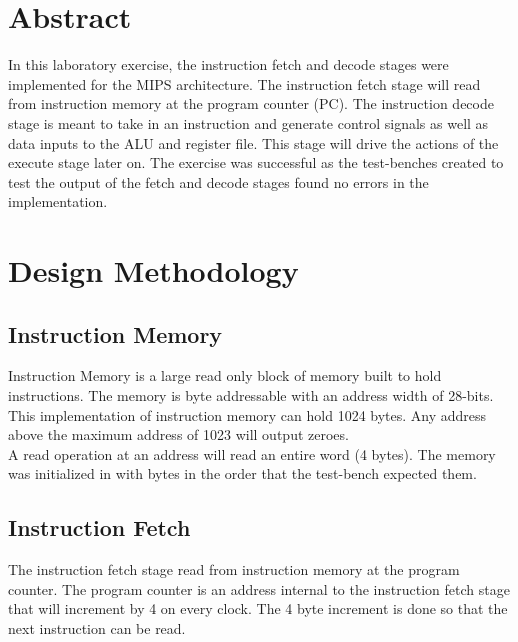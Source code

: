 \documentclass[CMPE]{../KGCOEReport}
\begin{document}
    \maketitle
    \section*{Abstract}

    In this laboratory exercise, the instruction fetch and decode stages were
    implemented for the MIPS architecture.
    The instruction fetch stage will read from instruction memory at the
    program counter (PC).
    The instruction decode stage is meant to take in an instruction and generate
    control signals as well as data inputs to the ALU and register file.
    This stage will drive the actions of the execute stage later on.
    The exercise was successful as the test-benches created to test the
    output of the fetch and decode stages found no errors in the implementation.

    \section*{Design Methodology}

    \subsection*{Instruction Memory}
    
	Instruction Memory is a large read only block of memory built to hold
	instructions. The memory is byte addressable with an address width of 
	28-bits. This implementation of instruction memory can hold 1024 bytes.
	Any address above the maximum address of 1023 will output zeroes.
	\\

    A read operation at an address will read an entire word (4 bytes).
    The memory was initialized in with bytes in the order that the test-bench
    expected them.
    
    \subsection*{Instruction Fetch}
	
	The instruction fetch stage read from instruction memory at the program
	counter.
	The program counter is an address internal to the instruction fetch stage
	that will increment by 4 on every clock.
	The 4 byte increment is done so that the next instruction can be read.
	
\end{document}
